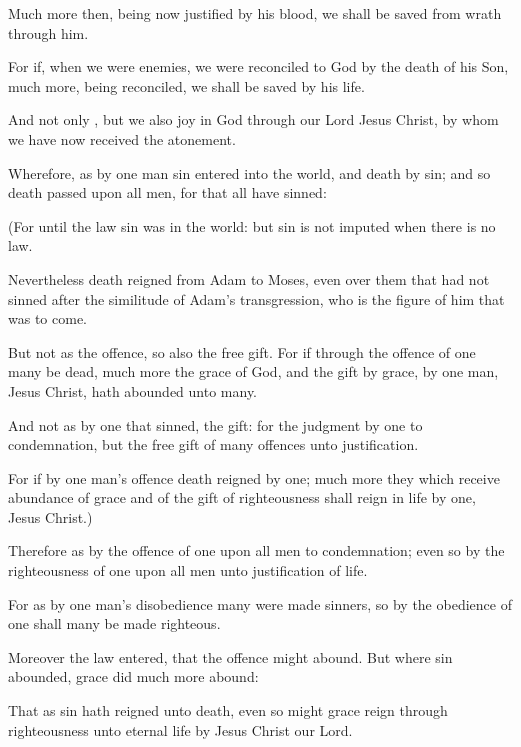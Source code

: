 {Much
more
then,
being
now
justified
by
his
blood, we shall be
saved
from
wrath
through
him.

For
if, when we
were
enemies, we were
reconciled to
God
by the
death of
his
Son,
much
more, being
reconciled, we shall be
saved
by
his
life.

And
not
only
{},
but
we
also
joy
in
God
through
our
Lord
Jesus
Christ,
by
whom we
have
now
received the
atonement.


\par }{\PP {}Wherefore,
as
by
one
man
sin
entered
into the
world,
and
death
by
sin;
and
so
death
passed
upon
all
men,
for
that
all have
sinned:

(For
until the
law
sin
was
in the
world:
but
sin
is
not
imputed when there
is
no
law.

Nevertheless
death
reigned
from
Adam
to
Moses,
even
over them that
had
not
sinned
after the
similitude
of
Adam’s
transgression,
who
is the
figure of him that was to
come.

But
not
as the
offence,
so
also
{} the free
gift.
For
if through the
offence of
one
many be
dead,
much
more the
grace of
God,
and the
gift
by
grace,
{} by
one
man,
Jesus
Christ, hath
abounded
unto
many.

And
not
as
{}
by
one that
sinned,
{} the
gift:
for the
judgment
{}
by
one
to
condemnation,
but the free
gift
{}
of
many
offences
unto
justification.

For
if
by one
man’s
offence
death
reigned
by
one;
much
more they which
receive
abundance of
grace
and of the
gift of
righteousness shall
reign
in
life
by
one,
Jesus
Christ.)

Therefore
as
by the
offence of
one
{}
upon
all
men
to
condemnation;
even
so
by the
righteousness of
one
{}
upon
all
men
unto
justification of
life.

For
as
by
one
man’s
disobedience
many were
made
sinners,
so
by the
obedience of
one
shall
many be
made
righteous.

Moreover the
law
entered,
that the
offence might
abound.
But
where
sin
abounded,
grace did much more
abound:

That
as
sin hath
reigned
unto
death,
even
so
might
grace
reign
through
righteousness
unto
eternal
life
by
Jesus
Christ
our
Lord.




\par }
